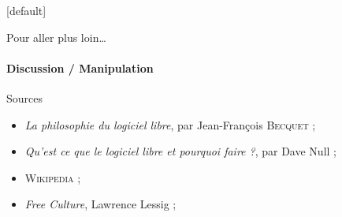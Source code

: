 [default]

\begin{frame}{Pour aller plus loin\dots}
  \framesubtitle{Discussion / Manipulation}
\end{frame}

\begin{frame}{Sources}\small
  \begin{itemize}
    \item \emph{La philosophie du logiciel libre}, par Jean-François \textsc{Becquet} ;
    \item \emph{Qu'est ce que le logiciel libre et pourquoi faire ?}, par Dave Null ;
    \item \textsc{Wikipedia} ;
    \item \emph{Free Culture}, Lawrence Lessig ;
  \end{itemize}
\end{frame}
